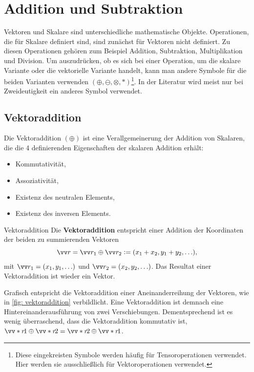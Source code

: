 \section{Addition und Subtraktion}\label{sec: Vektoraddition-subtraktion}
Vektoren und Skalare sind unterschiedliche mathematische Objekte. Operationen, die für
Skalare definiert sind, sind zunächst für Vektoren nicht definiert. Zu diesen Operationen gehören zum Beispiel Addition, Subtraktion, Multiplikation und Division.
Um auszudrücken, ob es sich bei einer Operation, um die skalare Variante oder die vektorielle Variante handelt, kann man andere Symbole für die beiden Varianten verwenden $(\oplus, \ominus, \otimes, *)$\footnote{Diese eingekreisten Symbole werden häufig für Tensoroperationen verwendet. Hier werden sie ausschließlich für Vektoroperationen verwendet.}.
In der Literatur wird meist nur bei Zweideutigkeit ein anderes Symbol verwendet. \\

\subsection{Vektoraddition}
Die Vektoraddition $(\oplus)$ ist eine Verallgemeinerung der Addition von Skalaren, die die 4 definierenden Eigenschaften der skalaren Addition erhält:
\begin{itemize}[itemsep=1.5pt]
    \item Kommutativität,
    \item Assoziativität,
    \item Existenz des neutralen Elements,
    \item  Existenz des inversen Elements.
\end{itemize}
\begin{rememberbox}[]{Vektoraddition}
    Die \textbf{Vektoraddition} entspricht einer Addition der Koordinaten der beiden zu summierenden Vektoren
    \begin{equation}
        \ivec{r} = \ivec{r_1} \oplus \ivec{r_2} \defeq (x_1+x_2, y_1+y_2, \ldots), 
    \end{equation}
mit $\ivec{r_1}=(x_1, y_1, \ldots)$ und $\ivec{r_2}=(x_2, y_2, \ldots)$. Das Resultat einer Vektoraddition ist wieder ein Vektor.
\end{rememberbox}
Grafisch entspricht die Vektoraddition einer Aneinanderreihung der Vektoren, wie in \cref{fig: vektoraddition} verbildlicht. Eine Vektoraddition ist demnach eine Hintereinanderausführung von zwei Verschiebungen. Dementsprechend ist es wenig überraschend, dass die Vektoraddition kommutativ ist, \gDh $\ivecS{r}{1} \oplus \ivecS{r}{2} = \ivecS{r}{2} \oplus \ivecS{r}{1}$. 

